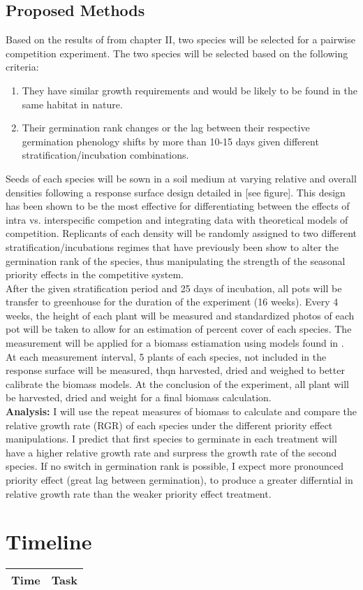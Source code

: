 \documentclass{article}\usepackage[]{graphicx}\usepackage[]{color}
\begin{document}
\subsection*{Proposed Methods}
\indent Based on the results of from chapter II, two species will be selected for a pairwise competition experiment. The two species will be selected based on the following criteria:
\begin{enumerate}
\item They have similar growth requirements and would be likely to be found in the same habitat in nature.
\item Their germination rank changes or the lag between their respective germination phenology shifts by more than 10-15 days given different stratification/incubation combinations.
\end{enumerate}
Seeds of each species will be sown in a soil medium at varying relative and overall densities following a response surface design detailed in \cite{Inouye_2000} [see figure]. This design has been shown to be the most effective for differentiating between the effects of intra vs. interspecific competion and integrating data with theoretical models of competition.  Replicants of each density will be randomly assigned to two different stratification/incubations regimes that have previously been show to alter the germination rank of the species, thus manipulating the strength of the seasonal priority effects in the competitive system.\\
After the given stratification period and 25 days of incubation, all pots will be transfer to greenhouse for the duration of the experiment (16 weeks). Every 4 weeks, the height of each plant will be measured and standardized photos of each pot will be taken to allow for an estimation of percent cover of each species. The measurement will be applied for a biomass estiamation using models found in \cite*{Axmanova_2012}. At each measurement interval, 5 plants of each species, not included in the response surface will be measured, thqn harvested, dried and weighed to better calibrate the biomass models. At the conclusion of the experiment, all plant will be harvested, dried and weight for a final biomass calculation.\\
\textbf{Analysis:} I will use the repeat measures of biomass to calculate and compare the relative growth rate (RGR) \citep{} of each species under the different priority effect manipulations. I predict that first species to germinate in each treatment will have a higher relative growth rate and surpress the growth rate of the second species. If no switch in germination rank is possible, I expect more pronounced priority effect (great lag between germination), to produce a greater differntial in relative growth rate than the weaker priority effect treatment.\\  


\section*{Timeline}
\begin{center}
\begin{tabular}{|l|l|}
Time & Task\\
\hline
\end{tabular}
\end{center}
\end{document}
